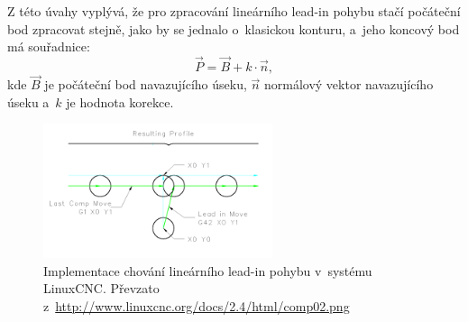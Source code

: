 			Z této úvahy vyplývá, že pro zpracování lineárního lead-in pohybu stačí počáteční bod zpracovat stejně, jako by se jednalo o~klasickou konturu, a~jeho koncový bod má souřadnice:
			\begin{equation}
			\vec{P} = \vec{B}+k\cdot\vec{n},
			\end{equation}
			kde $\vec{B}$ je počáteční bod navazujícího úseku, $\vec{n}$ normálový vektor navazujícího úseku a~$k$ je hodnota korekce.
			
			\begin{figure}[h]
				\centering
				\includegraphics[width=0.6\textwidth]{img/comp02.png}
				\caption{Implementace chování lineárního lead-in pohybu v~systému LinuxCNC. Převzato z~\url{http://www.linuxcnc.org/docs/2.4/html/comp02.png}}\label{nak:EMCk}	
			\end{figure}
			
